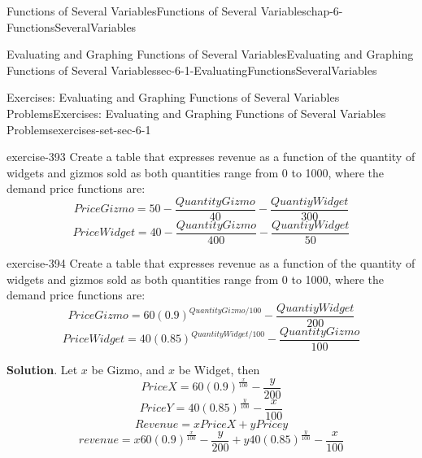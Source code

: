 \documentclass[oneside,10pt,]{book}
\numberwithin{equation}{section}
\begin{document}
\begin{chapterptx}{Functions of Several Variables}{}{Functions of Several Variables}{}{}{chap-6-FunctionsSeveralVariables}
\begin{sectionptx}{Evaluating and Graphing Functions of Several Variables}{}{Evaluating and Graphing Functions of Several Variables}{}{}{sec-6-1-EvaluatingFunctionsSeveralVariables}
\begin{exercises-subsection-numberless}{Exercises: Evaluating and Graphing Functions of Several Variables Problems}{}{Exercises: Evaluating and Graphing Functions of Several Variables Problems}{}{}{exercises-set-sec-6-1}
\begin{exercisegroup}
\begin{divisionexerciseeg}{16}{}{}{exercise-393}%
\hypertarget{p-2199}{}%
Create a table that expresses revenue as a function of the quantity of widgets and gizmos sold as both quantities range from 0 to 1000, where the demand price functions are:%
%
\begin{equation*}
PriceGizmo=50-\frac{QuantityGizmo}{40}-\frac{QuantiyWidget}{300}
\end{equation*}
%
\begin{equation*}
PriceWidget=40-\frac{QuantityGizmo}{400}-\frac{QuantiyWidget}{50}
\end{equation*}
\end{divisionexerciseeg}%
\begin{divisionexerciseeg}{17}{}{}{exercise-394}%
\hypertarget{p-2200}{}%
Create a table that expresses revenue as a function of the quantity of widgets and gizmos sold as both quantities range from 0 to 1000, where the demand price functions are:%
%
\begin{equation*}
PriceGizmo=60(0.9)^{QuantityGizmo/100}-\frac{QuantiyWidget}{200}
\end{equation*}
%
\begin{equation*}
PriceWidget=40(0.85)^{QuantityWidget/100}-\frac{QuantityGizmo}{100}
\end{equation*}
\par\smallskip%
\noindent\textbf{Solution}.\hypertarget{solution-198}{}\quad%
\hypertarget{p-2201}{}%
Let \(x\) be Gizmo, and \(x\) be Widget, then%
%
\begin{equation*}
PriceX=60(0.9)^{\frac{x}{100}}-\frac{y}{200}
\end{equation*}
%
\begin{equation*}
PriceY  =40(0.85)^{\frac{y}{100}}-\frac{x}{100} 
\end{equation*}
%
\begin{equation*}
Revenue=x PriceX+y Pricey
\end{equation*}
%
\begin{equation*}
revenue=x 60(0.9)^{\frac{x}{100}}-\frac{y}{200}+y 
40(0.85)^{\frac{y}{100}}-\frac{x}{100}
\end{equation*}
\begin{sidebyside}{1}{0}{0}{0}%
\begin{sbspanel}{1}%

\end{sbspanel}
\end{sidebyside}
\end{divisionexerciseeg}
\end{exercisegroup}
\end{exercises-subsection-numberless}
\end{sectionptx}
\end{chapterptx}
\end{document}

